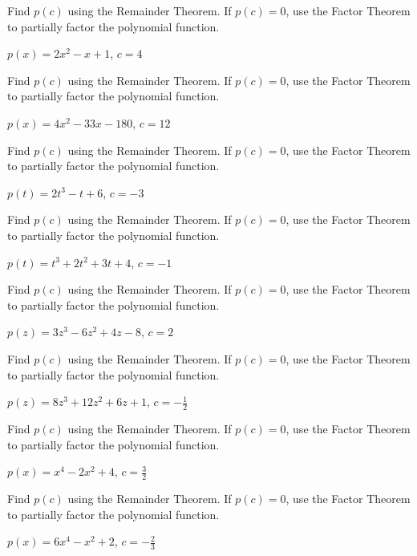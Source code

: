 \documentclass{ximera}
\begin{document}
\begin{problem}\label{remainderexerfirst}
Find $p(c)$ using the Remainder Theorem.  If $p(c) = 0$, use the Factor Theorem to partially factor the polynomial function.

$p(x) = 2x^2 - x + 1$, $c = 4$
\end{problem}

\begin{problem}
Find $p(c)$ using the Remainder Theorem.  If $p(c) = 0$, use the Factor Theorem to partially factor the polynomial function.

$p(x) = 4x^2-33x-180$, $c = 12$
\end{problem}

\begin{problem}
Find $p(c)$ using the Remainder Theorem.  If $p(c) = 0$, use the Factor Theorem to partially factor the polynomial function.

$p(t) = 2t^3 - t + 6$, $c=-3$
\end{problem}

\begin{problem}
Find $p(c)$ using the Remainder Theorem.  If $p(c) = 0$, use the Factor Theorem to partially factor the polynomial function.

$p(t) = t^3+2t^2+3t+4$, $c =-1$
\end{problem}

\begin{problem}
Find $p(c)$ using the Remainder Theorem.  If $p(c) = 0$, use the Factor Theorem to partially factor the polynomial function.

$p(z) =3z^3-6z^2+4z-8$, $c=2$
\end{problem}

\begin{problem}
Find $p(c)$ using the Remainder Theorem.  If $p(c) = 0$, use the Factor Theorem to partially factor the polynomial function.

$p(z) = 8z^3+12z^2+6z+1$, $c =-\frac{1}{2}$
\end{problem}

\begin{problem}
Find $p(c)$ using the Remainder Theorem.  If $p(c) = 0$, use the Factor Theorem to partially factor the polynomial function.

$p(x) = x^4 - 2x^2+4$, $c=\frac{3}{2}$
\end{problem}

\begin{problem}
Find $p(c)$ using the Remainder Theorem.  If $p(c) = 0$, use the Factor Theorem to partially factor the polynomial function.

$p(x) = 6x^4-x^2+2$, $c =-\frac{2}{3}$
\end{problem}
\end{document}
